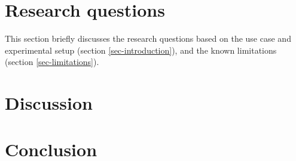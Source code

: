 \documentclass[conference]{IEEEtran}
\begin{document}
\section{Research questions}
This section briefly discusses the research questions based on the use case and experimental setup (section \ref{sec-introduction}), and the known limitations (section \ref{sec-limitations}).












\section{Discussion}


\section{Conclusion}
\end{document}

